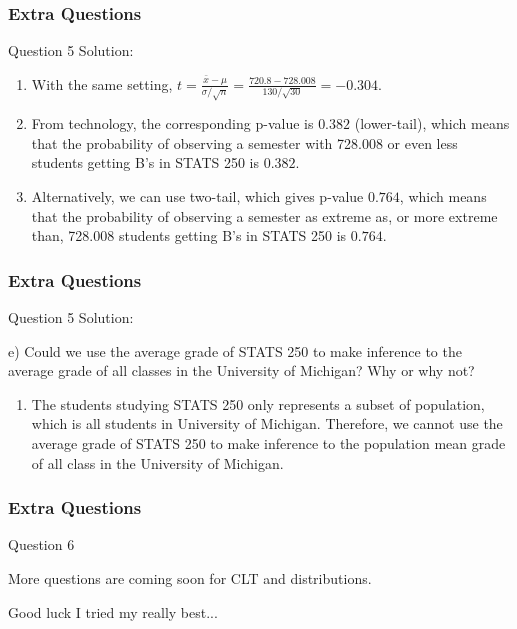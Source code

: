 \documentclass{beamer}
\begin{document}
\begin{frame}
\frametitle{Extra Questions}
\begin{block}{Question 5 Solution:}

\begin{enumerate}

\item With the same setting, $t = \frac{\bar x - \mu}{\sigma/\sqrt{n}} = \frac{720.8 - 728.008}{130/\sqrt{30}} = -0.304$.

\item From technology, the corresponding p-value is $0.382$ (lower-tail), which means that the probability of observing a semester with 728.008 or even less students getting B's in STATS 250 is $0.382$.

\item Alternatively, we can use two-tail, which gives p-value $0.764$, which means that the probability of observing a semester as extreme as, or more extreme than, 728.008 students getting B's in STATS 250 is $0.764$.

\end{enumerate}
\end{block}
\end{frame}


\begin{frame}
\frametitle{Extra Questions}
\begin{block}{Question 5 Solution:}

e) Could we use the average grade of STATS 250 to make inference to the average grade of all classes in the University of Michigan? Why or why not?
\begin{enumerate}

\item The students studying STATS 250 only represents a subset of population, which is all students in University of Michigan. Therefore, we cannot use the average grade of STATS 250 to make inference to the population mean grade of all class in the University of Michigan.

\end{enumerate}
\end{block}
\end{frame}

\begin{frame}
\frametitle{Extra Questions}
\begin{block}{Question 6 }

More questions are coming soon for CLT and distributions.

Good luck I tried my really best...

\end{block}
\end{frame}
\end{document}
